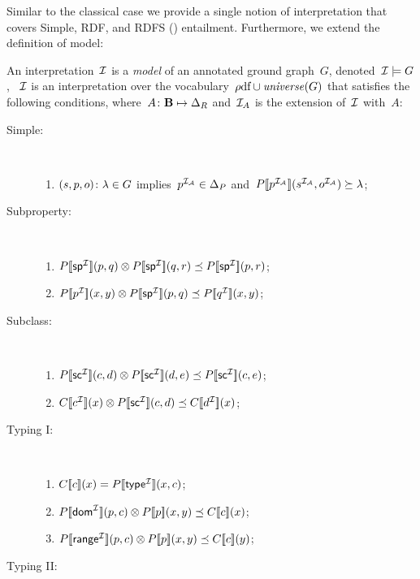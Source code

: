 Similar to the classical case we provide a single notion of interpretation that covers Simple, \ac{RDF}, and \ac{RDFS}
(\rhodf) entailment.  Furthermore, we extend the definition of model:
%
\begin{definition}
  \label{def:annotated-model}%
  \nd An interpretation~$\mathcal{I}$ is a \emph{model} of an annotated ground graph~$G$, denoted~$\mathcal{I} \models G$, \iff~$\mathcal{I}$ is an
  interpretation over the vocabulary~$\mbox{$\rho$df} \cup \mathit{\mathit{universe}}\!\left(G\right)$ that satisfies the following conditions, where~$A
  \colon \mathbf{B} \mapsto \Delta_{R}$ and~$\mathcal{I}_{A}$ is the extension of~$\mathcal{I}$ with~$A$:
  \begin{description}
  \item[Simple:] \
    \begin{enumerate}
    \item $\mbox{$(s, p, o)\colon\lambda$} \in G$ implies~${p}^{\mathcal{I}_{\mathcal{A}}} \in\Delta_{P}$ and~${P[\![{p}^{\mathcal{I}_{\mathcal{A}}}]\!]}({s}^{\mathcal{I}_{\mathcal{A}}}, {o}^{\mathcal{I}_{\mathcal{A}}})
      \succeq \lambda$;
    \end{enumerate}
  \item[Subproperty:] \
    \begin{enumerate}
    \item ${P[\![{ \mathsf{sp}}^{\mathcal{I}}]\!]}(p, q) \otimes {P[\![{ \ensuremath{\mathsf{sp}}}^{\ensuremath{\mathcal{I}}} ]\!]}(q, r) \preceq {P[\![{ \ensuremath{\mathsf{sp}}}^{\ensuremath{\mathcal{I}}} ]\!]}(p, r)$;
    \item ${P[\![{ p}^{\mathcal{I}}]\!]}(x, y) \otimes {P[\![{ \ensuremath{\mathsf{sp}}}^{\ensuremath{\mathcal{I}}} ]\!]}(p, q) \preceq {P[\![{ q}^{\ensuremath{\mathcal{I}}} ]\!]}(x, y)$;
    \end{enumerate}
  \item[Subclass:] \
    \begin{enumerate}
    \item ${P[\![{ \mathsf{sc}}^{\mathcal{I}}]\!]}(c, d) \otimes {P[\![{ \ensuremath{\mathsf{sc}}}^{\ensuremath{\mathcal{I}}} ]\!]}(d, e) \preceq {P[\![{ \ensuremath{\mathsf{sc}}}^{\ensuremath{\mathcal{I}}} ]\!]}(c, e)$;
    \item ${C[\![{c}^{\mathcal{I}}]\!]}(x) \otimes {P[\![{ \ensuremath{\mathsf{sc}}}^{\ensuremath{\mathcal{I}}} ]\!]}(c, d) \preceq {C[\![{ d}^{\ensuremath{\mathcal{I}}} ]\!]}(x)$;
    \end{enumerate}
  \item[Typing I:] \
    \begin{enumerate}
    \item ${C[\![c]\!]}(x) =  {P[\![{\mathsf{type}}^{\mathcal{I}}]\!]}(x,c)$;
    \item ${P[\![{\mathsf{dom}}^{\mathcal{I}}]\!]}(p, c) \otimes  {P[\![p]\!]}(x,y) \preceq  {C[\![c]\!]}(x)$;
    \item ${P[\![{\mathsf{range}}^{\mathcal{I}}]\!]}(p, c) \otimes  {P[\![p]\!]}(x,y) \preceq  {C[\![c]\!]}(y)$;
    \end{enumerate}
  \item[Typing II:] \

\end{description}
\end{definition}
